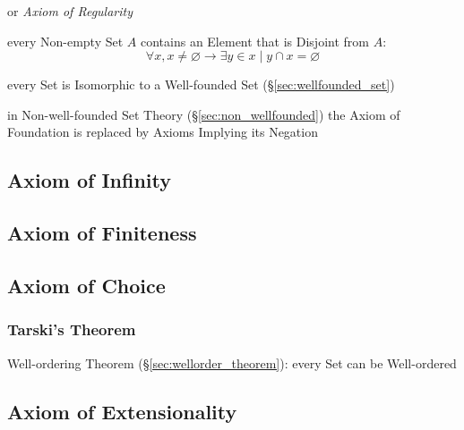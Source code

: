 or \emph{Axiom of Regularity}

every Non-empty Set $A$ contains an Element that is Disjoint from $A$:
\[
  \forall x, x \neq \varnothing \rightarrow \exists y \in x \mid y
  \cap x = \varnothing
\]

every Set is Isomorphic to a Well-founded Set
(\S\ref{sec:wellfounded_set})

in Non-well-founded Set Theory (\S\ref{sec:non_wellfounded}) the Axiom
of Foundation is replaced by Axioms Implying its Negation



\subsection{Axiom of Infinity}\label{sec:infinity_axiom}

\subsection{Axiom of Finiteness}\label{sec:finiteness_axiom}

\subsection{Axiom of Choice}\label{sec:choice_axiom}

\subsubsection{Tarski's Theorem}\label{sec:tarskis_theorem}

Well-ordering Theorem (\S\ref{sec:wellorder_theorem}): every Set can
be Well-ordered



\subsection{Axiom of Extensionality}\label{sec:extensionality_axiom}

